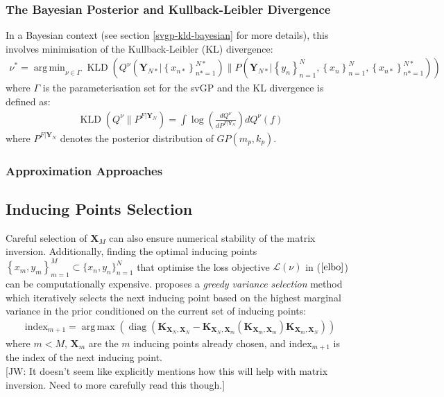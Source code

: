 \documentclass{article}
\newcommand{\jw}[1]{{\color{gray} [JW: #1]}}
\newcommand{\KLD}{\operatorname{KLD}}
\newcommand{\diag}{\operatorname{diag}}
\DeclareMathOperator*{\argmax}{arg\,max}
\DeclareMathOperator*{\argmin}{arg\,min}
\numberwithin{equation}{section}
\begin{document}
\subsubsection{The Bayesian Posterior and Kullback-Leibler Divergence}
In a Bayesian context (see section \ref{svgp-kld-bayesian} for more details), this involves minimisation of the Kullback-Leibler (KL) divergence:
\begin{align}
    \nu^* = \argmin_{\nu \in \Gamma} \KLD\left(Q^\nu\left(\mathbf{Y}_{N*} \Big\vert \left\{ x_{n*}\right\}_{n*=1}^{N*}\right) \Big\| P\left(\mathbf{Y}_{N*} \Big\vert \left\{ y_n\right\}_{n=1}^N,  \left\{ x_n\right\}_{n=1}^N,  \left\{ x_{n*}\right\}_{n*=1}^{N*}\right) \right)
    \label{svgp-minimiser}
\end{align}
where $\Gamma$ is the parameterisation set for the svGP and the KL divergence is defined as:
\begin{align}
    \KLD\left(Q^{\nu} \Big\| P^{F \vert \mathbf{Y}_N} \right) = \int \log \left( \frac{dQ^{\nu}}{d P^{F \vert \mathbf{Y}_N}} \right) d Q^{\nu}(f)
    \label{svgp-kld-loss}
\end{align}
where $P^{F \vert \mathbf{Y}_N}$ denotes the posterior distribution of $GP(m_p, k_p)$.
\subsubsection{Approximation Approaches}


\subsection{Inducing Points Selection}
Careful selection of $\mathbf{X}_M$ can also ensure numerical stability of the matrix inversion. Additionally, finding the optimal inducing points $\left\{x_m, y_m\right\}_{m=1}^{M} \subset \{x_n, y_n\}_{n=1}^{N}$ that optimise the loss objective $\mathcal{L}(\nu)$ in ($\ref{elbo}$) can be computationally expensive. \cite{burt2020convergence} proposes a \textit{greedy variance selection} method which iteratively selects the next inducing point based on the highest marginal variance in the prior conditioned on the current set of inducing points:
\begin{align}
    \label{greedy-varaince-selection}
    \text{index}_{m+1} = \argmax \left(\diag \left(\mathbf{K}_{\mathbf{X}_N, \mathbf{X}_N} - \mathbf{K}_{\mathbf{X}_N, \mathbf{X}_{m}} \left(\mathbf{K}_{\mathbf{X}_{m}, \mathbf{X}_{m}} \right) \mathbf{K}_{\mathbf{X}_{m}, \mathbf{X}_N}\right)\right)
\end{align}
where $m < M$, $\mathbf{X}_{m}$ are the $m$ inducing points already chosen, and $\text{index}_{m+1}$ is the index of the next inducing point.
\\\jw{It doesn't seem like \cite{burt2020convergence} explicitly mentions how this will help with matrix inversion. Need to more carefully read this though.}
\end{document}
